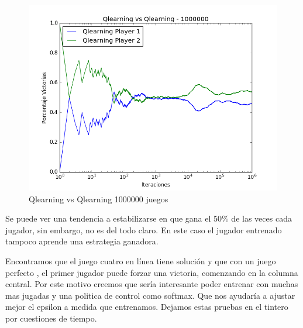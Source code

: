 \begin{figure}[H]
 \centering
 \begin{minipage}{.45\textwidth}
	\centering
	\includegraphics[scale=0.35]{resultados/7x6/QlearningVsQlearning_1000000_7x6_parametros_informe.png}
        \caption{Qlearning vs Qlearning 1000000 juegos}
  \end{minipage}
\end{figure}

Se puede ver una tendencia a estabilizarse en que gana el 50\% de las veces cada jugador, sin embargo, no es del todo claro. En este caso el jugador entrenado tampoco aprende una estrategia ganadora. \\



Encontramos que el juego cuatro en línea tiene solución y que con un juego perfecto , el primer jugador puede forzar una victoria, comenzando en la columna central. Por este motivo creemos que sería interesante poder entrenar con muchas mas jugadas y una politica de control como softmax. Que nos ayudaría a ajustar mejor el epsilon a medida que entrenamos. Dejamos estas pruebas en el tintero por cuestiones de tiempo.





